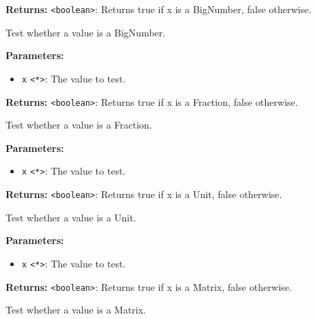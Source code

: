 \documentclass[12pt,a4paper]{article}
\begin{document}
\noindent \textbf{Returns:} \texttt{<boolean>}: Returns true if \textasciigrave{}x\textasciigrave{} is a BigNumber, false otherwise.

\noindent Test whether a value is a BigNumber.

\vspace{5mm}
\noindent {}


\noindent \textbf{Parameters:}
\begin{itemize}
  \item \texttt{x} \texttt{<*>}: The value to test.
\end{itemize}

\noindent \textbf{Returns:} \texttt{<boolean>}: Returns true if \textasciigrave{}x\textasciigrave{} is a Fraction, false otherwise.

\noindent Test whether a value is a Fraction.

\vspace{5mm}
\noindent {}


\noindent \textbf{Parameters:}
\begin{itemize}
  \item \texttt{x} \texttt{<*>}: The value to test.
\end{itemize}

\noindent \textbf{Returns:} \texttt{<boolean>}: Returns true if \textasciigrave{}x\textasciigrave{} is a Unit, false otherwise.

\noindent Test whether a value is a Unit.

\vspace{5mm}
\noindent {}


\noindent \textbf{Parameters:}
\begin{itemize}
  \item \texttt{x} \texttt{<*>}: The value to test.
\end{itemize}

\noindent \textbf{Returns:} \texttt{<boolean>}: Returns true if \textasciigrave{}x\textasciigrave{} is a Matrix, false otherwise.

\noindent Test whether a value is a Matrix.
\end{document}
